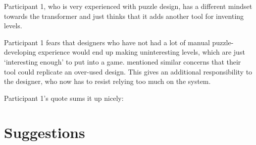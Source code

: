 Participant 1, who is very experienced with puzzle design, has a different mindset towards the transformer and just thinks that it adds another tool for inventing levels.

Participant 1 fears that designers who have not had a lot of manual puzzle-developing experience would end up making uninteresting levels, which are just `interesting enough' to put into a game. \cite{Guzdial} mentioned similar concerns that their tool could replicate an over-used design. This gives an additional responsibility to the designer, who now has to resist relying too much on the system.

Participant 1's quote sums it up nicely: 
\textit{} %



\section{Suggestions}

